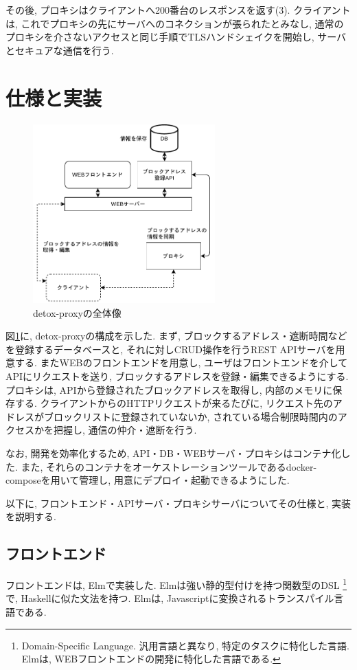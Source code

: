 \documentclass[10pt,a4paper,uplatex,a4j,dvipdfmx]{jsarticle}
\begin{document}
\begin{multicols}{2}
    その後, プロキシはクライアントへ200番台のレスポンスを返す(3).
    クライアントは, これでプロキシの先にサーバへのコネクションが張られたとみなし, 通常のプロキシを介さないアクセスと同じ手順でTLSハンドシェイクを開始し, サーバとセキュアな通信を行う.

    \section{仕様と実装}
    \begin{figure}[H]
      \center
      \includegraphics[width=7cm]{img/proxyall.pdf}
      \caption{detox-proxyの全体像 \label{img:proxy:all}}
    \end{figure}
    
    図\ref{img:proxy:all}に, detox-proxyの構成を示した.
    まず, ブロックするアドレス・遮断時間などを登録するデータベースと, それに対しCRUD操作を行うREST APIサーバを用意する. またWEBのフロントエンドを用意し, ユーザはフロントエンドを介してAPIにリクエストを送り, ブロックするアドレスを登録・編集できるようにする.
    プロキシは, APIから登録されたブロックアドレスを取得し, 内部のメモリに保存する. クライアントからのHTTPリクエストが来るたびに, リクエスト先のアドレスがブロックリストに登録されていないか, されている場合制限時間内のアクセスかを把握し, 通信の仲介・遮断を行う.
    
    なお, 開発を効率化するため, API・DB・WEBサーバ・プロキシはコンテナ化した.
    また, それらのコンテナをオーケストレーションツールであるdocker-composeを用いて管理し, 用意にデプロイ・起動できるようにした.
    
    以下に, フロントエンド・APIサーバ・プロキシサーバについてその仕様と, 実装を説明する.

    \subsection{フロントエンド}
    フロントエンドは, Elm\cite{elm}で実装した.
    Elmは強い静的型付けを持つ関数型のDSL
    \footnote{Domain-Specific Language. 汎用言語と異なり, 特定のタスクに特化した言語. Elmは, WEBフロントエンドの開発に特化した言語である.}
    で, Haskell\cite{haskell}に似た文法を持つ. Elmは, Javascriptに変換されるトランスパイル言語である.


\end{multicols}
\end{document}

